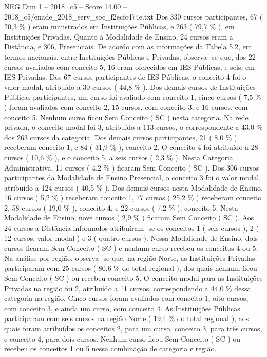 \begin{textsample}{NEG Dim 1 – 2018\_c5 – Score 14.00 – 2018\_c5/enade\_2018\_serv\_soc\_f2ecfc474e.txt}
Dos 330 cursos participantes, 67 ( 20,3 \% ) eram ministrados em Instituições Públicas, e 263 ( 79,7 \% ), em Instituições Privadas.
Quanto à Modalidade de Ensino, 24 cursos eram a Distância, e 306, Presenciais.
De acordo com as informações da Tabela 5.2, em termos nacionais, entre Instituições Públicas e Privadas, observa -se que, dos 22 cursos avaliados com conceito 5, 16 eram oferecidos em IES Públicas, e seis, em IES Privadas.
Dos 67 cursos participantes de IES Públicas, o conceito 4 foi o valor modal, atribuído a 30 cursos ( 44,8 \% ).
Dos demais cursos de Instituições Públicas participantes, um curso foi avaliado com conceito 1, cinco cursos ( 7,5 \% ) foram avaliados com conceito 2, 15 cursos, com conceito 3, e 16 cursos, com conceito 5.
Nenhum curso ficou Sem Conceito ( SC ) nesta categoria.
Na rede privada, o conceito modal foi 3, atribuído a 113 cursos, o correspondente a 43,0 \% dos 263 cursos da categoria.
Dos demais cursos participantes, 21 ( 8,0 \% ) receberam conceito 1, e 84 ( 31,9 \% ), conceito 2.
O conceito 4 foi atribuído a 28 cursos ( 10,6 \% ), e o conceito 5, a seis cursos ( 2,3 \% ).
Nesta Categoria Administrativa, 11 cursos ( 4,2 \% ) ficaram Sem Conceito ( SC ).
Dos 306 cursos participantes da Modalidade de Ensino Presencial, o conceito 3 foi o valor modal, atribuído a 124 cursos ( 40,5 \% ).
Dos demais cursos nesta Modalidade de Ensino, 16 cursos ( 5,2 \% ) receberam conceito 1, 77 cursos ( 25,2 \% ) receberam conceito 2, 58 cursos ( 19,0 \% ), conceito 4, e 22 cursos ( 7,2 \% ), conceito 5.
Nesta Modalidade de Ensino, nove cursos ( 2,9 \% ) ficaram Sem Conceito ( SC ).
Aos 24 cursos a Distância informados atribuíram -se os conceitos 1 ( seis cursos ), 2 ( 12 cursos, valor modal ) e 3 ( quatro cursos ).
Nessa Modalidade de Ensino, dois cursos ficaram Sem Conceito ( SC ) e nenhum curso recebeu os conceitos 4 ou 5.
Na análise por região, observa -se que, na região Norte, as Instituições Privadas participaram com 25 cursos ( 80,6 \% do total regional ), dos quais nenhum ficou Sem Conceito ( SC ) ou recebeu conceito 5.
O conceito modal para as Instituições Privadas na região foi 2, atribuído a 11 cursos, correspondendo a 44,0 \% dessa categoria na região.
Cinco cursos foram avaliados com conceito 1, oito cursos, com conceito 3, e ainda um curso, com conceito 4.
As Instituições Públicas participaram com seis cursos na região Norte ( 19,4 \% do total regional ), aos quais foram atribuídos os conceitos 2, para um curso, conceito 3, para três cursos, e conceito 4, para dois cursos.
Nenhum curso ficou Sem Conceito ( SC ) ou recebeu os conceitos 1 ou 5 nessa combinação de categoria e região.

\end{textsample}
